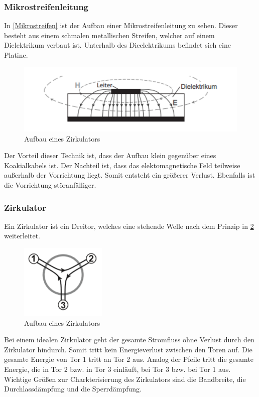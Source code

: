 \subsubsection{Mikrostreifenleitung}
In \cref{Mikrostreifen} ist der Aufbau einer Mikrostreifenleitung zu sehen. Dieser besteht aus einem schmalen metallischen Streifen, welcher auf einem Dielektrikum verbaut ist. Unterhalb des Dieelektrikums befindet sich eine Platine.
\begin{figure}[h!]
	\centering
	\includegraphics[scale = 1]{mikrostreifen.png}
	\caption{Aufbau eines Zirkulators}
	\label{ZB}
\end{figure}
Der Vorteil dieser Technik ist, dass der Aufbau klein gegenüber eines Koakialkabels ist. Der Nachteil ist, dass das elektomagnetische Feld teilweise außerhalb der Vorrichtung liegt. Somit entsteht ein größerer Verlust. Ebenfalls ist die Vorrichtung störanfälliger.

\subsubsection{Zirkulator}
Ein Zirkulator ist ein Dreitor, welches eine stehende Welle nach dem Prinzip in \cref{ZB} weiterleitet.
\begin{figure}[h!]
	\centering
	\includegraphics[scale = 1]{Zirk-Bild.PNG}
	\caption{Aufbau eines Zirkulators}
	\label{ZB}
\end{figure}
Bei einem idealen Zirkulator geht der gesamte Stromfluss ohne Verlust  durch den Zirkulator hindurch. Somit tritt kein Energieverlust zwischen den Toren auf. Die gesamte Energie von Tor 1 tritt an Tor 2 aus. Analog der Pfeile tritt die gesamte Energie, die in Tor 2 bzw. in Tor 3 einläuft, bei Tor 3 bzw. bei Tor 1 aus. Wichtige Größen zur Charkterisierung des Zirkulators sind die Bandbreite, die Durchlassdämpfung und die Sperrdämpfung.

